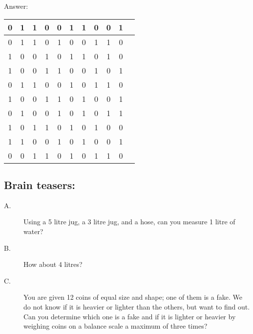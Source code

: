 \documentclass{article}
\begin{document}
Answer:
\begin{table}[ht]
\centering
\begin{tabular}{|c|c|c|c|c|c|c|c|c|c|c|}
\hline 0 & 1 & 1 & 0 & 0 & 1 & 1 & 0 & 0 & 1 \\ 
\hline 0 & 1 & 1 & 0 & 1 & 0 & 0 & 1 & 1 & 0 \\ 
\hline 1 & 0 & 0 & 1 & 0 & 1 & 1 & 0 & 1 & 0 \\ 
\hline 1 & 0 & 0 & 1 & 1 & 0 & 0 & 1 & 0 & 1 \\ 
\hline 0 & 1 & 1 & 0 & 0 & 1 & 0 & 1 & 1 & 0 \\ 
\hline 1 & 0 & 0 & 1 & 1 & 0 & 1 & 0 & 0 & 1 \\ 
\hline 0 & 1 & 0 & 0 & 1 & 0 & 1 & 0 & 1 & 1 \\ 
\hline 1 & 0 & 1 & 1 & 0 & 1 & 0 & 1 & 0 & 0 \\ 
\hline 1 & 1 & 0 & 0 & 1 & 0 & 1 & 0 & 0 & 1 \\ 
\hline 0 & 0 & 1 & 1 & 0 & 1 & 0 & 1 & 1 & 0 \\
\hline
\end{tabular}
\end{table} 


\subsection*{Brain teasers:}
\begin{description}
\item[A.] Using a 5 litre jug, a 3 litre jug, and a hose, can you measure 1 litre of water? %

\item[B.] How about 4 litres? %

\item[C.] You are given 12 coins of equal size and shape; one of them is a fake. We do  not know if it is heavier or lighter than the others, but want to find out. Can you determine which one is a fake and if it is lighter or heavier by weighing coins on a balance scale a maximum of three times? %
\end{description}
\end{document}
